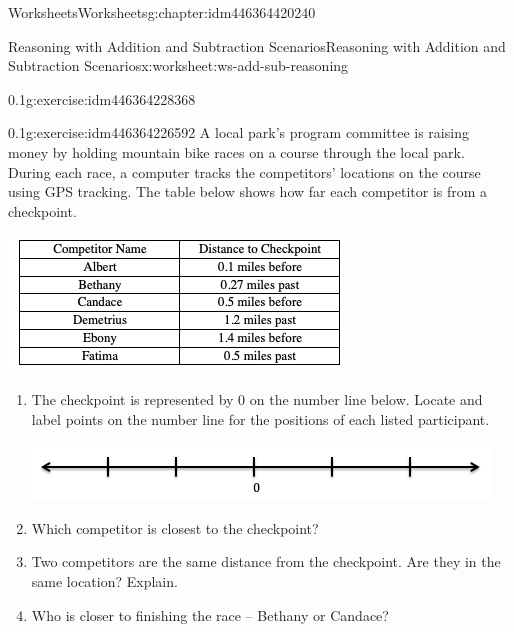 \documentclass[twoside,11pt,]{book}
\begin{document}
\begin{chapterptx}{Worksheets}{}{Worksheets}{}{}{g:chapter:idm446364420240}
\begin{worksheet-section-numberless}{Reasoning with Addition and Subtraction Scenarios}{}{Reasoning with Addition and Subtraction Scenarios}{}{}{x:worksheet:ws-add-sub-reasoning}
\begin{divisionexercise}{4}{}{0.1}{g:exercise:idm446364228368}
\end{divisionexercise}%
\begin{divisionexercise}{5}{}{0.1}{g:exercise:idm446364226592}%
A local park’s program committee is raising money by holding mountain bike races on a course through the local park.  During each race, a computer tracks the competitors’ locations on the course using GPS tracking.  The table below shows how far each competitor is from a checkpoint.%
\begin{sidebyside}{1}{0.05}{0.05}{0}%
\begin{sbspanel}{0.9}%
\includegraphics[width=1\linewidth]{images/reasoning-table-checkpoint.png}
\end{sbspanel}%
\end{sidebyside}%
%
\begin{enumerate}[label=(\alph*)]
\item{}The checkpoint is represented by 0 on the number line below.  Locate and label points on the number line for the positions of each listed participant. \begin{sidebyside}{1}{0.05}{0.05}{0}%
\begin{sbspanel}{0.9}%
\includegraphics[width=1\linewidth]{images/blank-number-line.png}
\end{sbspanel}%
\end{sidebyside}%
%
\item{}Which competitor is closest to the checkpoint?%
\item{}Two competitors are the same distance from the checkpoint.  Are they in the same location?  Explain.%
\item{}Who is closer to finishing the race – Bethany or Candace?%
\end{enumerate}
\end{divisionexercise}%

\end{worksheet-section-numberless}
\end{chapterptx}
\end{document}
